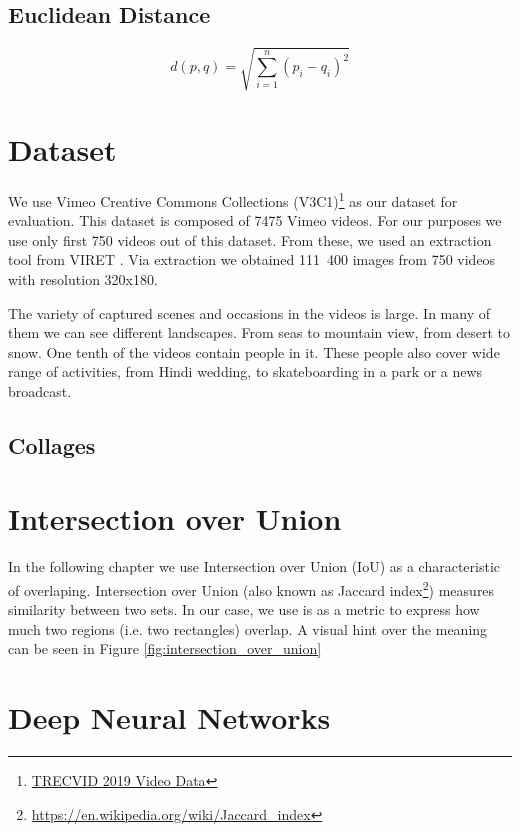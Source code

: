 \subsection{Euclidean Distance}
\begin{equation}
d(p, q) = \sqrt{\sum_{i=1}^n (p_i - q_i)^2}    
\end{equation}

\section{Dataset}

We use Vimeo Creative Commons Collections (V3C1)\footnote{\href{https://www-nlpir.nist.gov/projects/tv2019/data.html}{TRECVID 2019 Video Data}} as our dataset for evaluation. This dataset is composed of 7475 Vimeo videos. For our purposes we use only first 750 videos out of this dataset. From these, we used an extraction tool from VIRET \cite{lokovc2019framework}. Via extraction we obtained 111\ 400 images from 750 videos with resolution 320x180.

The variety of captured scenes and occasions in the videos is large. In many of them we can see different landscapes. From seas to mountain view, from desert to snow. One tenth of the videos contain people in it. These people also cover wide range of activities, from Hindi wedding, to skateboarding in a park or a news broadcast.

\subsection{Collages}



\section{Intersection over Union}

In the following chapter we use Intersection over Union (IoU) as a characteristic of overlaping. Intersection over Union (also known as Jaccard index\footnote{\href{https://en.wikipedia.org/wiki/Jaccard_index}{https://en.wikipedia.org/wiki/Jaccard\_index}}) measures similarity between two sets. In our case, we use is as a metric to express how much two regions (i.e. two rectangles) overlap. A visual hint over the meaning can be seen in Figure \ref{fig:intersection_over_union}

\section{Deep Neural Networks}

